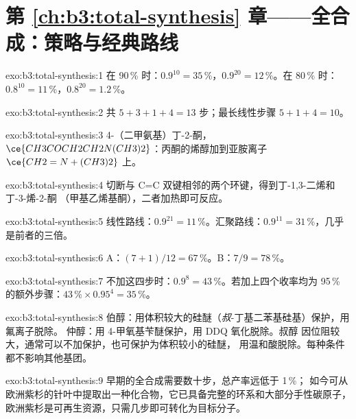 \section*{第 \ref{ch:b3:total-synthesis} 章——全合成：策略与经典路线}

\begin{solution}{exo:b3:total-synthesis:1}
在 90\,\% 时：$0.9^{10} = 35$\,\%，$0.9^{20} = 12$\,\%。在 80\,\% 时：$0.8^{10} = 11$\,\%，$0.8^{20} = 1.2$\,\%。
\end{solution}

\begin{solution}{exo:b3:total-synthesis:2}
共 $5 + 3 + 1 + 4 = 13$ 步；最长线性步骤 $5 + 1 + 4 = 10$。
\end{solution}

\begin{solution}{exo:b3:total-synthesis:3}
4-（二甲氨基）丁-2-酮，$\ce{CH3COCH2CH2N(CH3)2}$：丙酮的烯醇加到亚胺离子
$\ce{CH2=N+(CH3)2}$ 上。
\end{solution}

\begin{solution}{exo:b3:total-synthesis:4}
切断与 C=C 双键相邻的两个环键，得到丁-1,3-二烯和丁-3-烯-2-酮
（甲基乙烯基酮），二者加热即可反应。
\end{solution}

\begin{solution}{exo:b3:total-synthesis:5}
线性路线：$0.9^{21} = 11$\,\%。汇聚路线：$0.9^{11} = 31$\,\%，几乎是前者的三倍。
\end{solution}

\begin{solution}{exo:b3:total-synthesis:6}
A：$(7 + 1)/12 = 67$\,\%。B：$7/9 = 78$\,\%。
\end{solution}

\begin{solution}{exo:b3:total-synthesis:7}
不加这四步时：$0.9^8 = 43$\,\%。若加上四个收率均为 95\,\% 的额外步骤：$43\,\% \times 0.95^4 = 35$\,\%。
\end{solution}

\begin{solution}{exo:b3:total-synthesis:8}
伯醇：用体积较大的硅醚（\textit{叔}-丁基二苯基硅基）保护，用氟离子脱除。
仲醇：用 4-甲氧基苄醚保护，用 DDQ 氧化脱除。叔醇
因位阻较大，通常可以不加保护，也可保护为体积较小的硅醚，
用温和酸脱除。每种条件都不影响其他基团。
\end{solution}

\begin{solution}{exo:b3:total-synthesis:9}
早期的全合成需要数十步，总产率远低于 1\,\%；
如今可从欧洲紫杉的针叶中提取出一种化合物，它已具备完整的环系和大部分手性碳原子，
欧洲紫杉是可再生资源，只需几步即可转化为目标分子。
\end{solution}


